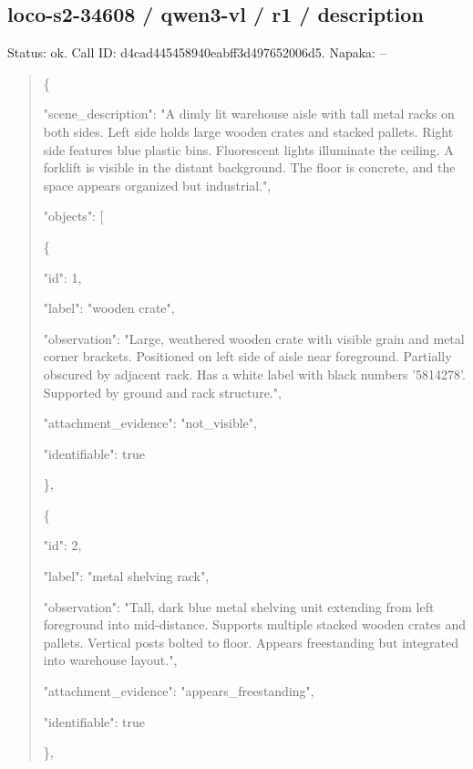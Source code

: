 \documentclass[10pt,a4paper]{article}
\begin{document}
\subsection*{loco-s2-34608 / qwen3-vl / r1 / description}
Status: ok. Call ID: d4cad445458940eabff3d497652006d5. Napaka: --
\begin{quote}\footnotesize
\{\par
  "scene\_description":\allowbreak{} "A dimly lit warehouse aisle with tall metal racks on both sides. Left side holds large wooden crates and stacked pallets. Right side features blue plastic bins. Fluorescent lights illuminate the ceiling. A forklift is visible in the distant background. The floor is concrete,\allowbreak{} and the space appears organized but industrial.",\allowbreak{}\par
  "objects":\allowbreak{} [\par
    \{\par
      "id":\allowbreak{} 1,\allowbreak{}\par
      "label":\allowbreak{} "wooden crate",\allowbreak{}\par
      "observation":\allowbreak{} "Large,\allowbreak{} weathered wooden crate with visible grain and metal corner brackets. Positioned on left side of aisle near foreground. Partially obscured by adjacent rack. Has a white label with black numbers '5814278'. Supported by ground and rack structure.",\allowbreak{}\par
      "attachment\_evidence":\allowbreak{} "not\_visible",\allowbreak{}\par
      "identifiable":\allowbreak{} true\par
    \},\allowbreak{}\par
    \{\par
      "id":\allowbreak{} 2,\allowbreak{}\par
      "label":\allowbreak{} "metal shelving rack",\allowbreak{}\par
      "observation":\allowbreak{} "Tall,\allowbreak{} dark blue metal shelving unit extending from left foreground into mid-distance. Supports multiple stacked wooden crates and pallets. Vertical posts bolted to floor. Appears freestanding but integrated into warehouse layout.",\allowbreak{}\par
      "attachment\_evidence":\allowbreak{} "appears\_freestanding",\allowbreak{}\par
      "identifiable":\allowbreak{} true\par
    \},\allowbreak{}\par

\end{quote}
\end{document}
